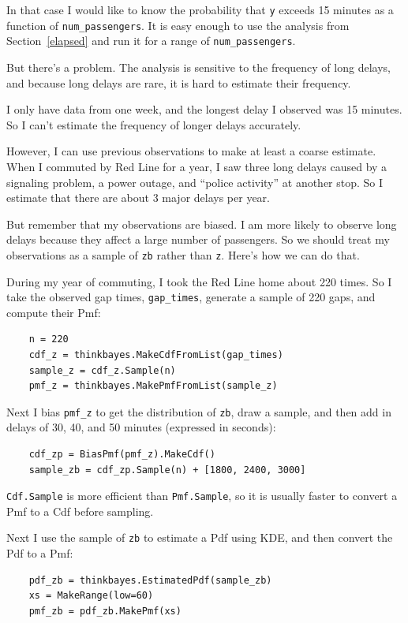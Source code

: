 \documentclass[12pt]{book}
\begin{document}
In that case I would like to know the probability that {\tt y} exceeds
15 minutes as a function of \verb"num_passengers".  It is easy enough
to use the
analysis from Section~\ref{elapsed} and run it for a range of
\verb"num_passengers".

But there's a problem.
The analysis is sensitive to the frequency of long delays, and
because long delays are rare, it is hard to estimate
their frequency.

I only have data from one week,
and the longest delay I observed was 15 minutes.  So I can't
estimate the frequency of longer delays accurately.

However, I can use previous observations to make at least a coarse
estimate.  When I commuted by Red Line for a year, I saw three long
delays caused by a signaling problem, a power outage, and ``police
activity'' at another stop.  So I estimate that there are about
3 major delays per year.

But remember that my observations are biased.  I am more likely
to observe long delays because they affect a large number
of passengers.  So we should treat my observations as a sample
of {\tt zb} rather than {\tt z}.  Here's how we can do that.

During my year of commuting, I took the Red Line home about 220
times.  So I take the observed gap times, \verb"gap_times",
generate a sample of 220 gaps, and compute their Pmf:

\begin{verbatim}
    n = 220
    cdf_z = thinkbayes.MakeCdfFromList(gap_times)
    sample_z = cdf_z.Sample(n)
    pmf_z = thinkbayes.MakePmfFromList(sample_z)
\end{verbatim}

Next I bias \verb"pmf_z" to get the distribution of
{\tt zb}, draw a sample, and then add in delays of
30, 40, and 50 minutes (expressed in seconds):

\begin{verbatim}
    cdf_zp = BiasPmf(pmf_z).MakeCdf()
    sample_zb = cdf_zp.Sample(n) + [1800, 2400, 3000]
\end{verbatim}

{\tt Cdf.Sample} is more efficient than {\tt Pmf.Sample}, so it
is usually faster to convert a Pmf to a Cdf before sampling.

Next I use the sample of {\tt zb} to estimate a Pdf using
KDE, and then convert the Pdf to a Pmf:

\begin{verbatim}
    pdf_zb = thinkbayes.EstimatedPdf(sample_zb)
    xs = MakeRange(low=60)
    pmf_zb = pdf_zb.MakePmf(xs)
\end{verbatim}
\end{document}
